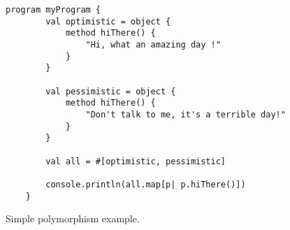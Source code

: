 
\begin{figure}[ht]
 \centering
 \begin{lstlisting}[language=Wollok]
	program myProgram {
		val optimistic = object {
			method hiThere() {
				"Hi, what an amazing day !"
			}
		}

		val pessimistic = object {
			method hiThere() {
				"Don't talk to me, it's a terrible day!"
			}
		}
		
		val all = #[optimistic, pessimistic]
		
		console.println(all.map[p| p.hiThere()])
	}
 \end{lstlisting}
 
 \caption{\small Simple polymorphism example.}
 \label{fig:polymorphism}
\end{figure}
